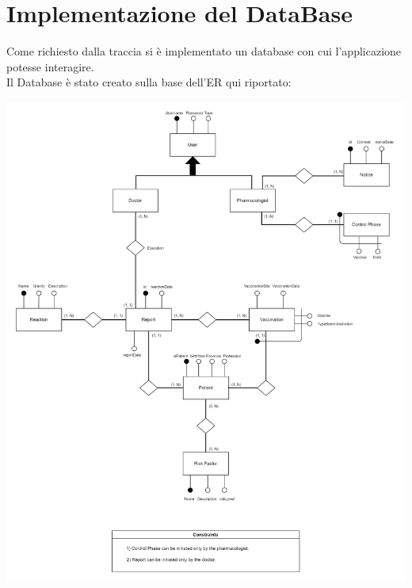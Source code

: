 \documentclass[11pt]{article}
\begin{document}
    \section{Implementazione del DataBase}
    Come richiesto dalla traccia si è implementato un database con cui l'applicazione potesse interagire.\\
    Il Database è stato creato sulla base dell'ER qui riportato:
        \begin{center}
            \includegraphics[width=1\textwidth]{pictures/Schema_ER.png}
        \end{center}
\end{document}
